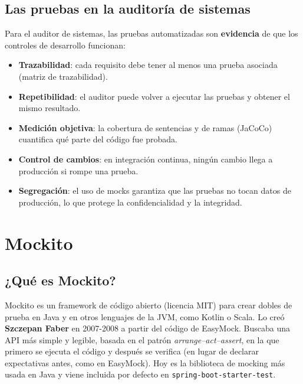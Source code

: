\documentclass[11pt,a4paper,oneside]{report}
\newcommand{\code}[1]{\texttt{#1}}
\begin{document}
\section{Las pruebas en la auditoría de sistemas}
Para el auditor de sistemas, las pruebas automatizadas son \textbf{evidencia} de que los controles de desarrollo funcionan:
\begin{itemize}
  \item \textbf{Trazabilidad}: cada requisito debe tener al menos una prueba asociada (matriz de trazabilidad).
  \item \textbf{Repetibilidad}: el auditor puede volver a ejecutar las pruebas y obtener el mismo resultado.
  \item \textbf{Medición objetiva}: la cobertura de sentencias y de ramas (JaCoCo) cuantifica qué parte del código fue probada.
  \item \textbf{Control de cambios}: en integración continua, ningún cambio llega a producción si rompe una prueba.
  \item \textbf{Segregación}: el uso de mocks garantiza que las pruebas no tocan datos de producción, lo que protege la confidencialidad y la integridad.
\end{itemize}

\chapter{Mockito}

\section{¿Qué es Mockito?}
Mockito es un framework de código abierto (licencia MIT) para crear dobles de prueba en Java y en otros lenguajes de la JVM, como Kotlin o Scala. Lo creó \textbf{Szczepan Faber} en 2007-2008 a partir del código de EasyMock. Buscaba una API más simple y legible, basada en el patrón \emph{arrange--act--assert}, en la que primero se ejecuta el código y después se verifica (en lugar de declarar expectativas antes, como en EasyMock). Hoy es la biblioteca de mocking más usada en Java y viene incluida por defecto en \code{spring-boot-starter-test}.
\end{document}
